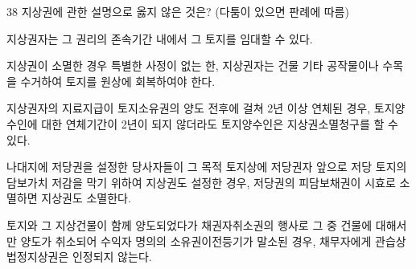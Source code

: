 \begin{question}{38}
지상권에 관한 설명으로 옳지 않은 것은? (다툼이 있으면 판례에 따름)
\begin{choices}
  \item 지상권자는 그 권리의 존속기간 내에서 그 토지를 임대할 수 있다.
  \item 지상권이 소멸한 경우 특별한 사정이 없는 한, 지상권자는 건물 기타 공작물이나 수목을 수거하여 토지를 원상에 회복하여야 한다.
  \item 지상권자의 지료지급이 토지소유권의 양도 전후에 걸쳐 2년 이상 연체된 경우, 토지양수인에 대한 연체기간이 2년이 되지 않더라도 토지양수인은 지상권소멸청구를 할 수 있다.
  \item 나대지에 저당권을 설정한 당사자들이 그 목적 토지상에 저당권자 앞으로 저당 토지의 담보가치 저감을 막기 위하여 지상권도 설정한 경우, 저당권의 피담보채권이 시효로 소멸하면 지상권도 소멸한다.
  \item 토지와 그 지상건물이 함께 양도되었다가 채권자취소권의 행사로 그 중 건물에 대해서만 양도가 취소되어 수익자 명의의 소유권이전등기가 말소된 경우, 채무자에게 관습상 법정지상권은 인정되지 않는다.
\end{choices}
\end{question}
